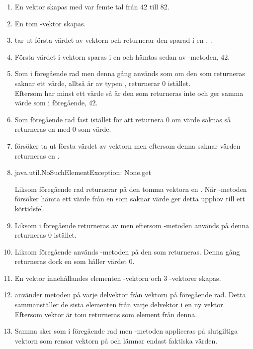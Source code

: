 \SubtaskSolved \begin{enumerate}
\item En vektor  skapas med var femte tal från 42 till 82.
\item En tom -vektor  skapas.
\item {} tar ut första värdet av vektorn  och returnerar den sparad i en , .
\item Första värdet i vektorn  sparas i en  och hämtas sedan av -metoden, 42.
\item Som i föregående rad men denna gång används  som om den  som returneras saknar ett värde, alltså är av typen , returnerar 0 istället.\\
 Eftersom  har minst ett värde så är den  som returneras inte  och ger samma värde som i föregående, 42.
\item Som föregående rad fast istället för att returnera 0 om värde saknas så returneras en  med 0 som värde.
\item {} försöker ta ut första värdet av vektorn  men eftersom denna saknar värden returneras en .
\item \begin{REPL}
java.util.NoSuchElementException: None.get
\end{REPL}
Liksom föregående rad returnerar  på den tomma vektorn  en . När  -metoden försöker hämta ett värde från en  som saknar värde ger detta upphov till ett körtidsfel.
\item Liksom i föregående returneras   av  men eftersom -metoden används på denna  returneras 0 istället.
\item Liksom föregående används -metoden på den  som returneras. Denna gång returneras dock en  som håller värdet 0.
\item En vektor innehållandes elementen -vektorn och 3 -vektorer skapas.
\item {} använder metoden  på varje delvektor från vektorn på föregående rad. Detta sammanställer de sista elementen från varje delvektor i en ny vektor. Eftersom vektor  är tom returneras  som element från denna.
\item Samma sker som i föregående rad men -metoden appliceras på slutgiltiga vektorn som rensar vektorn på  och lämnar endast faktiska värden.

\end{enumerate}
